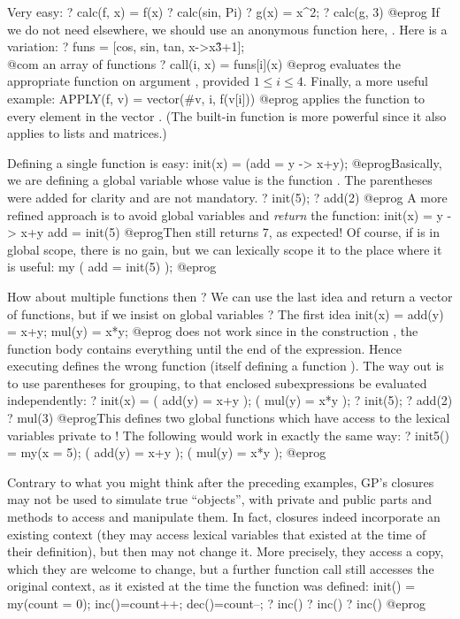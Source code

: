  Very easy:
\bprog
? calc(f, x) = f(x)
? calc(sin, Pi)
? g(x) = x^2;
? calc(g, 3)
@eprog
\noindent If we do not need  elsewhere, we should use an anonymous
function here, . Here is a variation:
\bprog
? funs = [cos, sin, tan, x->x\^3+1]; \\@com an array of functions
? call(i, x) = funs[i](x)
@eprog\noindent
evaluates the appropriate function on argument ,
provided $1\leq i\leq 4$. Finally, a more useful example:
\bprog
APPLY(f, v) = vector(#v, i, f(v[i]))
@eprog\noindent
applies the function  to every element in the vector .
(The built-in function  is more powerful since it also applies to
lists and matrices.)

Defining a single function is easy:
\bprog
init(x) = (add = y -> x+y);
@eprog\noindent Basically, we are defining a global variable 
whose value is the function . The parentheses were added for
clarity and are not mandatory.
\bprog
? init(5);
? add(2)
@eprog\noindent
A more refined approach is to
avoid global variables and \emph{return} the function:
\bprog
init(x) = y -> x+y
add = init(5)
@eprog\noindent Then  still returns 7, as expected! Of course,
if  is in global scope, there is no gain, but we can
lexically scope it to the place where it is useful:
\bprog
  my ( add = init(5) );
@eprog

How about multiple functions then ? We can use the last idea and return a
vector of functions, but if we insist on global variables ?
The first idea
\bprog
init(x) = add(y) = x+y; mul(y) = x*y;
@eprog
\noindent does not work since in the construction , the
function body contains everything until the end of the expression. Hence
executing  defines the wrong function  (itself defining
a function ). The way out is to
use parentheses for grouping, to that enclosed subexpressions be
evaluated independently:
\bprog
? init(x) = ( add(y) = x+y ); ( mul(y) = x*y );
? init(5);
? add(2)
? mul(3)
@eprog\noindent This defines two global functions which have access to the
lexical variables private to ! The following would work in exactly
the same way:
\bprog
? init5() = my(x = 5); ( add(y) = x+y ); ( mul(y) = x*y );
@eprog

 Contrary to what you might think after the
preceding examples, GP's closures may not be used to simulate true
``objects'', with private and public parts and methods to access and
manipulate them. In fact, closures indeed incorporate an existing context
(they may access lexical variables that existed at the time of their
definition), but then may not change it. More precisely, they access a copy,
which they are welcome to change, but a further function call still accesses
the original context, as it existed at the time the function was defined:
\bprog
init() =
{ my(count = 0);
  inc()=count++;
  dec()=count--;
}
? inc()
? inc()
? inc()
@eprog

